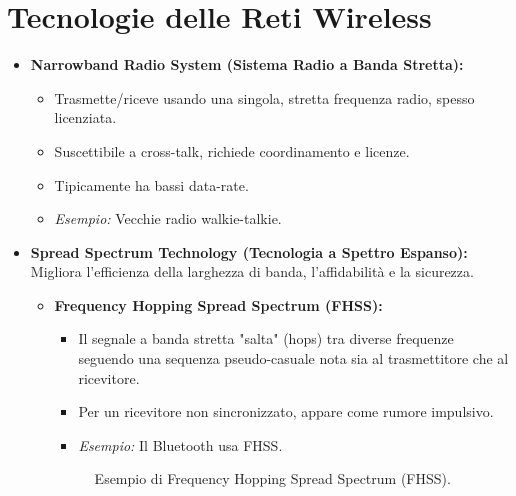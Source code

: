 \section{Tecnologie delle Reti Wireless}
\begin{itemize}
    \item \textbf{Narrowband Radio System (Sistema Radio a Banda Stretta):}
    \begin{itemize}
        \item Trasmette/riceve usando una singola, stretta frequenza radio, spesso licenziata.
        \item Suscettibile a cross-talk, richiede coordinamento e licenze.
        \item Tipicamente ha bassi data-rate.
        \item \textit{Esempio:} Vecchie radio walkie-talkie.
    \end{itemize}
    \item \textbf{Spread Spectrum Technology (Tecnologia a Spettro Espanso):}
    Migliora l'efficienza della larghezza di banda, l'affidabilità e la sicurezza.
    \begin{itemize}
        \item \textbf{Frequency Hopping Spread Spectrum (FHSS):}
        \begin{itemize}
            \item Il segnale a banda stretta "salta" (hops) tra diverse frequenze seguendo una sequenza pseudo-casuale nota sia al trasmettitore che al ricevitore.
            \item Per un ricevitore non sincronizzato, appare come rumore impulsivo.
            \item \textit{Esempio:} Il Bluetooth usa FHSS.
        \end{itemize}
        \begin{figure}[H]
        \centering
        \caption{Esempio di Frequency Hopping Spread Spectrum (FHSS).}
        \label{fig:fhss}
        \end{figure}


\end{itemize}
\end{itemize}
